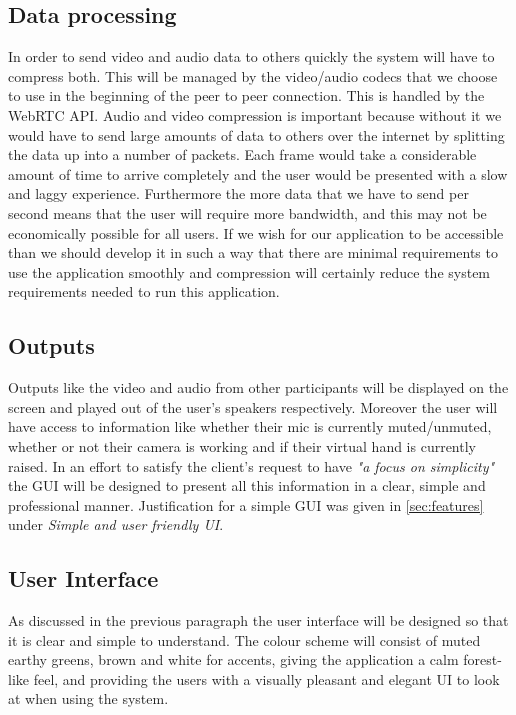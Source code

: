 \subsection{Data processing}

In order to send video and audio data to others quickly the 
system will have to compress both. This will be managed by the
video/audio codecs that we choose to use in the beginning of
the peer to peer connection. This is handled by the
WebRTC API. Audio and video compression is 
important because without it we would have to send large 
amounts of data to others over the internet by splitting the
data up into a number of packets. Each frame would take a 
considerable amount of time to arrive completely and the user
would be presented with a slow and laggy experience.
Furthermore the more data that we have to send per second 
means that the user will require more bandwidth, and this 
may not be economically possible for all users. If we wish 
for our application to be accessible than we should develop it
in such a way that there are minimal requirements to use the 
application smoothly and compression will certainly reduce the
system requirements needed to run this application.

\subsection{Outputs}

Outputs like the video and audio from other participants will 
be displayed on the screen and played out of the user's 
speakers respectively. Moreover the user will have access to 
information like whether their mic is currently muted/unmuted,
whether or not their camera is working and if their virtual 
hand is currently raised. In an effort to satisfy the client's
request to have \textit{"a focus on simplicity"} the GUI will
be designed to present all this information in a clear, simple
and professional manner. Justification for a simple GUI was
given in \ref{sec:features} under \textit{Simple and user 
friendly UI}.

\subsection{User Interface}

As discussed in the previous paragraph the user interface will
be designed so that it is clear and simple to understand. The 
colour scheme will consist of muted earthy greens, brown and
white for accents, giving the application a calm forest-like 
feel, and providing the users with a visually pleasant and 
elegant UI to look at when using the system.

